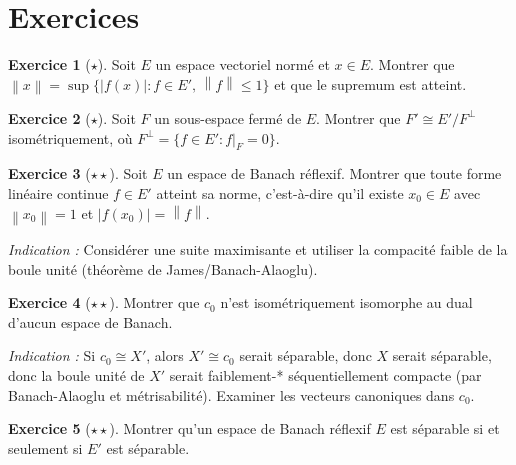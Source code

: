 \documentclass[a4paper,12pt]{book}
\newcommand{\norm}[1]{\left\| #1 \right\|}
\newcommand{\abs}[1]{\left| #1 \right|}
\theoremstyle{definition}
\newtheorem{exercice}{Exercice}[chapter]
\theoremstyle{plain}
\theoremstyle{remark}
\begin{document}

\section{Exercices}
\label{sec:exo-ch7}

\begin{exercice}[$\star$]
\label{exo:dual-separe}
Soit $E$ un espace vectoriel normé et $x \in E$.
Montrer que $\norm{x} = \sup\{ \abs{f(x)} : f \in E',\, \norm{f} \le 1 \}$
et que le supremum est atteint.
\end{exercice}

\begin{exercice}[$\star$]
\label{exo:dual-sous-espace}
Soit $F$ un sous-espace fermé de $E$. Montrer que $F' \cong E'/F^\perp$ isométriquement,
où $F^\perp = \{ f \in E' : f|_F = 0 \}$.
\end{exercice}

\begin{exercice}[$\star\star$]
\label{exo:reflexif-atteint}
Soit $E$ un espace de Banach réflexif. Montrer que toute forme linéaire continue
$f \in E'$ atteint sa norme, c'est-à-dire qu'il existe $x_0 \in E$ avec
$\norm{x_0} = 1$ et $\abs{f(x_0)} = \norm{f}$.

\textit{Indication :} Considérer une suite maximisante et utiliser la compacité faible
de la boule unité (théorème de James/Banach-Alaoglu).
\end{exercice}

\begin{exercice}[$\star\star$]
\label{exo:c0-non-dual}
Montrer que $c_0$ n'est isométriquement isomorphe au dual d'aucun espace de Banach.

\textit{Indication :} Si $c_0 \cong X'$, alors $X' \cong c_0$ serait séparable, donc
$X$ serait séparable, donc la boule unité de $X'$ serait faiblement-* séquentiellement compacte
(par Banach-Alaoglu et métrisabilité). Examiner les vecteurs canoniques dans $c_0$.
\end{exercice}

\begin{exercice}[$\star\star$]
\label{exo:reflexif-separable}
Montrer qu'un espace de Banach réflexif $E$ est séparable si et seulement si $E'$
est séparable.
\end{exercice}
\end{document}
